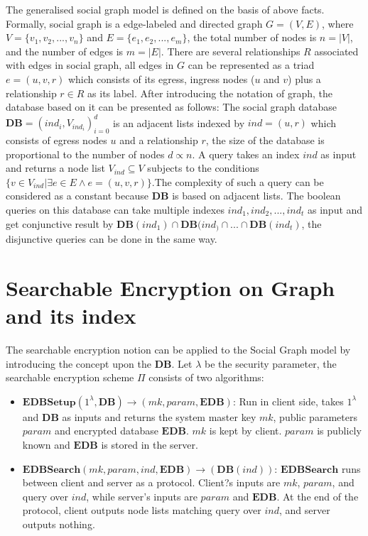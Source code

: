 The generalised social graph model is defined on the basis of above facts. Formally, social graph is a edge-labeled and directed graph $G = (V, E)$, where $V = \{v_1, v_2, ..., v_n\}$ and $E = \{e_1, e_2, ..., e_m\}$, the total number of nodes is $n = |V|$, and the number of edges is $m = |E|$. There are several relationships $R$ associated with edges in social graph, all edges in $G$ can be represented as a triad $e = (u, v, r)$ which consists of its egress, ingress nodes ($u$ and $v$) plus a relationship $r\in R$ as its label. 
After introducing the notation of graph, the database based on it can be presented as follows: The social graph database $\mathbf{DB} = (ind_i, V_{{ind}_{i}})_{i=0}^{d}$ is an adjacent lists indexed by $ind = (u, r)$ which consists of egress nodes $u$ and a relationship $r$, the size of the database is proportional to the number of nodes $d \propto n$. 
A query takes an index $ind$ as input and returns a node list $V_{{ind}} \subseteq V$ subjects to the conditions $\{v\in V_{{ind}} | \exists e\in E \land e= (u, v, r)\}$.The complexity of such a query can be considered as a constant because $\mathbf{DB}$ is based on adjacent lists. The boolean queries on this database can take multiple indexes $ind_1, ind_2, ..., ind_t$ as input and get conjunctive result by $\mathbf{DB}(ind_1)\cap \mathbf{DB}(ind_)\cap ... \cap \mathbf{DB}(ind_t)$, the disjunctive queries can be done in the same way. 

\section{Searchable Encryption on Graph and its index}
The searchable encryption notion can be applied to the Social Graph model by introducing the concept upon the $\mathbf{DB}$. Let $\lambda$ be the security parameter, the searchable encryption scheme $\Pi$ consists of two algorithms:
\begin{itemize}
\setlength{\itemsep}{0pt}
\item $\mathbf{EDBSetup}(1^{\lambda}, \mathbf{DB})\rightarrow (mk, param, \mathbf{EDB})$: Run in client side, takes $1^{\lambda}$and $\mathbf{DB}$ as inputs and returns the system master key $mk$, public parameters $param$ and encrypted database $\mathbf{EDB}$. $mk$ is kept by client. $param$ is publicly known and $\mathbf{EDB}$ is stored in the server.
\item $\mathbf{EDBSearch}(mk, param, ind, \mathbf{EDB})\rightarrow (\mathbf{DB}(ind))$: $\mathbf{EDBSearch}$ runs between client and server as a protocol. Client?s inputs are $mk$, $param$, and query over $ind$, while server's inputs are $param$ and $\mathbf{EDB}$. At the end of the protocol, client outputs node lists matching query over $ind$, and server outputs nothing.
\end{itemize}

